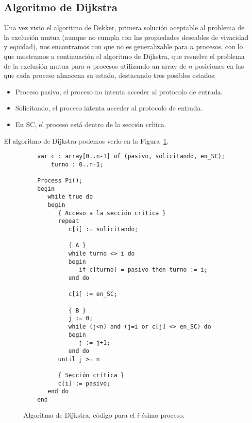 \subsection{Algoritmo de Dijkstra}
Una vez visto el algoritmo de Dekker, primera solución aceptable al problema de la exclusión mutua (aunque no cumpla con las propiedades deseables de vivacidad y equidad), nos encontramos con que no es generalizable para $n$ procesos, con lo que mostramos a continuación el algoritmo de Dijkstra, que resuelve el problema de la exclusión mutua para $n$ procesos utilizando un array de $n$ posiciones en las que cada proceso almacena su estado, destacando tres posibles estados:
\begin{itemize}
    \item Proceso pasivo, el proceso no intenta acceder al protocolo de entrada.
    \item Solicitando, el proceso intenta acceder al protocolo de entrada.
    \item En SC, el proceso está dentro de la sección crítica.
\end{itemize}
El algoritmo de Dijkstra podemos verlo en la Figura~\ref{fig:cod_dijkstra}.
\begin{figure}[H]
\begin{verbatim}
    var c : array[0..n-1] of (pasivo, solicitando, en_SC);
        turno : 0..n-1;

    Process Pi();
    begin
       while true do
       begin
          { Acceso a la sección crítica }
          repeat
             c[i] := solicitando;

             { A }
             while turno <> i do
             begin
                if c[turno] = pasivo then turno := i;
             end do

             c[i] := en_SC;

             { B }
             j := 0;
             while (j<n) and (j=i or c[j] <> en_SC) do
             begin
                j := j+1;
             end do
          until j >= n

          { Sección crítica }
          c[i] := pasivo;
       end do
    end
\end{verbatim}
\caption{Algoritmo de Dijkstra, código para el $i$-ésimo proceso.}
\label{fig:cod_dijkstra}
\end{figure}

